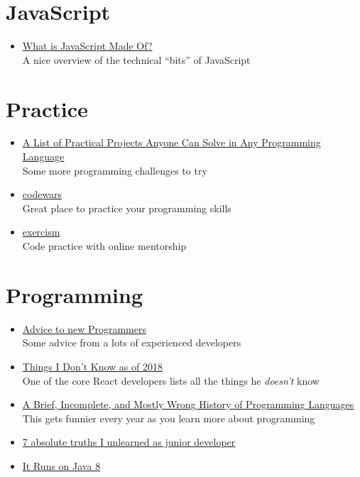\section*{JavaScript}

\begin{itemize}[leftmargin=*]
    \item
        \href{https://overreacted.io/what-is-javascript-made-of/}{What is JavaScript Made Of?}\\
        A nice overview of the technical ``bits'' of JavaScript
\end{itemize}


\section*{Practice}

\begin{itemize}[leftmargin=*]
    \item
        \href{https://github.com/karan/Projects}{A List of Practical Projects Anyone Can Solve in Any Programming Language}\\
        Some more programming challenges to try
    \item
        \href{https://www.codewars.com}{codewars}\\
        Great place to practice your programming skills
    \item
        \href{https://exercism.io}{exercism}\\
        Code practice with online mentorship
\end{itemize}

\section*{Programming}

\begin{itemize}[leftmargin=*]
    \item
        \href{http://olafurw.com/2019-01-27-programmer-advice/}{Advice to new Programmers}\\
        Some advice from a lots of experienced developers
    \item
        \href{https://overreacted.io/things-i-dont-know-as-of-2018/}{Things I Don't Know as of 2018}\\
        One of the core React developers lists all the things he \textit{doesn't} know
    \item
        \href{http://james-iry.blogspot.com/2009/05/brief-incomplete-and-mostly-wrong.html}{A Brief, Incomplete, and Mostly Wrong History of Programming Languages}\\
        This gets funnier every year as you learn more about programming
    \item
        \href{https://monicalent.com/blog/2019/06/03/absolute-truths-unlearned-as-junior-developer/}{7 absolute truths I unlearned as junior developer}
    \item
        \href{https://veekaybee.github.io/2019/05/10/java8/}{It Runs on Java 8}
\end{itemize}

